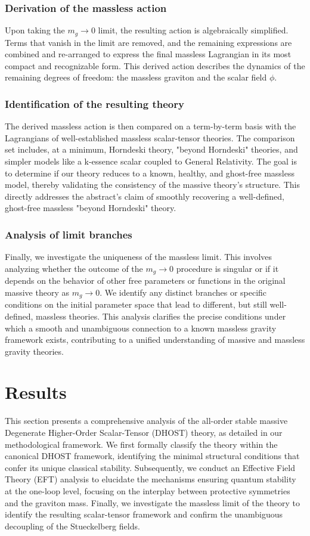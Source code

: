 \documentclass[twocolumn]{aastex631}
\begin{document}
\subsubsection{Derivation of the massless action}
Upon taking the $m_g \to 0$ limit, the resulting action is algebraically simplified. Terms that vanish in the limit are removed, and the remaining expressions are combined and re-arranged to express the final massless Lagrangian in its most compact and recognizable form. This derived action describes the dynamics of the remaining degrees of freedom: the massless graviton and the scalar field $\phi$.

\subsubsection{Identification of the resulting theory}
The derived massless action is then compared on a term-by-term basis with the Lagrangians of well-established massless scalar-tensor theories. The comparison set includes, at a minimum, Horndeski theory, "beyond Horndeski" theories, and simpler models like a k-essence scalar coupled to General Relativity. The goal is to determine if our theory reduces to a known, healthy, and ghost-free massless model, thereby validating the consistency of the massive theory's structure. This directly addresses the abstract's claim of smoothly recovering a well-defined, ghost-free massless "beyond Horndeski" theory.

\subsubsection{Analysis of limit branches}
Finally, we investigate the uniqueness of the massless limit. This involves analyzing whether the outcome of the $m_g \to 0$ procedure is singular or if it depends on the behavior of other free parameters or functions in the original massive theory as $m_g \to 0$. We identify any distinct branches or specific conditions on the initial parameter space that lead to different, but still well-defined, massless theories. This analysis clarifies the precise conditions under which a smooth and unambiguous connection to a known massless gravity framework exists, contributing to a unified understanding of massive and massless gravity theories.

\section{Results}
\label{sec:results}
This section presents a comprehensive analysis of the all-order stable massive Degenerate Higher-Order Scalar-Tensor (DHOST) theory, as detailed in our methodological framework. We first formally classify the theory within the canonical DHOST framework, identifying the minimal structural conditions that confer its unique classical stability. Subsequently, we conduct an Effective Field Theory (EFT) analysis to elucidate the mechanisms ensuring quantum stability at the one-loop level, focusing on the interplay between protective symmetries and the graviton mass. Finally, we investigate the massless limit of the theory to identify the resulting scalar-tensor framework and confirm the unambiguous decoupling of the Stueckelberg fields.
\end{document}
